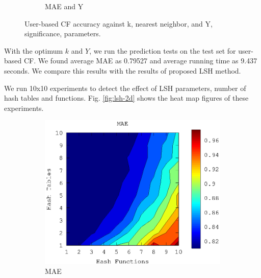 \documentclass[conference]{IEEEtran}
\begin{document}
\begin{figure}
\begin{subfigure}[b]{0.225\textwidth}
                \caption{MAE and Y}
                \label{fig:mae-y-ub}
        \end{subfigure} 
        \caption{User-based CF accuracy against k, nearest neighbor, and Y, significance, parameters.}
        \label{fig:ub-parameters}
\end{figure}


With the optimum $k$ and $Y$,  we run the prediction tests on the test set for user-based CF. We found average MAE as 0.79527 and average running time as 9.437 seconds. We compare this results with the results of proposed LSH method.

We run 10x10 experiments to detect the effect of LSH parameters, number of hash tables and functions. Fig. \ref{fig:lsh-2d} shows the heat map figures of these experiments.

\begin{figure}
        \begin{subfigure}[b]{0.225\textwidth}
                \includegraphics[width=\textwidth]{charts/mae-lsh-heat-map.eps}
                \caption{MAE}
                \label{fig:lsh-2d-mae}
        \end{subfigure}
        \quad
        \begin{subfigure}[b]{0.225\textwidth}

\end{subfigure}
\end{figure}
\end{document}
